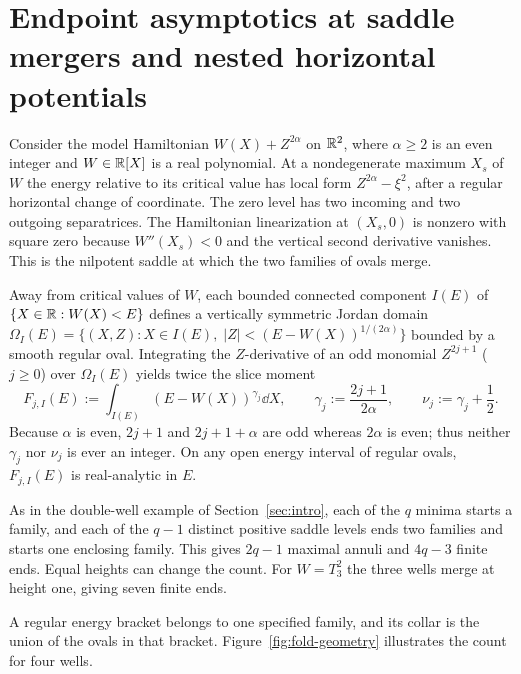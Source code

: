 \section{Endpoint asymptotics at saddle mergers and nested horizontal potentials}\label{sec:horizontal}

Consider the model Hamiltonian $W(X)+Z^{2\alpha}$ on $\mathbb{R}^2$, where $\alpha\ge 2$ is an even integer and $W\in\mathbb{R}[X]$ is a real polynomial. At a nondegenerate maximum \(X_s\) of \(W\) the energy relative to its critical value has local form \(Z^{2\alpha}-\xi^2\), after a regular horizontal change of coordinate. The zero level has two incoming and two outgoing separatrices. The Hamiltonian linearization at \((X_s,0)\) is nonzero with square zero because \(W''(X_s)<0\) and the vertical second derivative vanishes. This is the nilpotent saddle at which the two families of ovals merge.

Away from critical values of $W$, each bounded connected component $I(E)$ of $\{X\in\mathbb{R} : W(X)<E\}$ defines a vertically symmetric Jordan domain $\Omega_I(E)=\{(X,Z): X\in I(E),\; |Z|<(E-W(X))^{1/(2\alpha)}\}$ bounded by a smooth regular oval. Integrating the $Z$-derivative of an odd monomial $Z^{2j+1}$ ($j\ge 0$) over $\Omega_I(E)$ yields twice the slice moment
\begin{equation}\label{eq:model-moment}
  F_{j,I}(E) := \int_{I(E)} (E-W(X))^{\gamma_j}\dd X, \qquad
  \gamma_j := \frac{2j+1}{2\alpha}, \qquad \nu_j := \gamma_j + \frac{1}{2}.
\end{equation}
Because $\alpha$ is even, $2j+1$ and $2j+1+\alpha$ are odd whereas $2\alpha$ is even; thus neither $\gamma_j$ nor $\nu_j$ is ever an integer. On any open energy interval of regular ovals, $F_{j,I}(E)$ is real-analytic in $E$.

As in the double-well example of Section~\ref{sec:intro}, each of the \(q\) minima starts a family, and each of the \(q-1\) distinct positive saddle levels ends two families and starts one enclosing family. This gives \(2q-1\) maximal annuli and \(4q-3\) finite ends. Equal heights can change the count. For \(W=T_3^2\) the three wells merge at height one, giving seven finite ends.

A regular energy bracket belongs to one specified family, and its collar is the union of the ovals in that bracket. Figure~\ref{fig:fold-geometry} illustrates the count for four wells.



